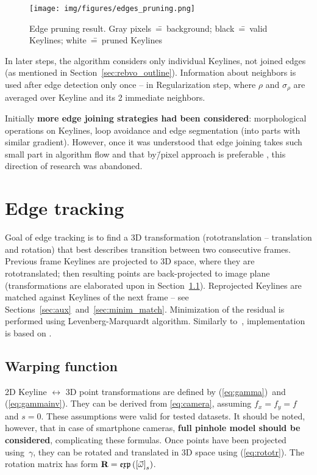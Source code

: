\begin{figure}[ht]
	\centering\texttt{[image: img/figures/edges\_pruning.png]}
	\caption{ Edge pruning result. Gray pixels~\==~background; black~\==~valid Keylines; white~\==~pruned Keylines }
	\label{fig:pruning}
\end{figure}

In later steps, the algorithm considers only individual Keylines, not joined edges (as mentioned in Section~\ref{sec:rebvo_outline}). Information about neighbors is used after edge detection only once -- in Regularization step, where $\rho$ and $\sigma_{\rho}$
are averaged over Keyline and its 2 immediate neighbors.

Initially \textbf{more edge joining strategies had been considered}: morphological operations on Keylines, loop avoidance and edge segmentation (into parts with similar gradient). However, once it was understood that edge joining takes such small part in algorithm flow and that by\=/pixel approach is preferable \cite{harris}, this direction of research was abandoned.



\section{Edge tracking}
\label{sec:edge_tracking}

Goal of edge tracking is to find a 3D transformation (rototranslation -- translation and rotation) that best describes transition between two consecutive frames. Previous frame Keylines are projected to 3D space, where they are rototranslated; then resulting points are back-projected to image plane (transformations are elaborated upon in Section~\ref{sec:warp}). Reprojected Keylines are matched against Keylines of the next frame -- see Sections~\ref{sec:aux}~and~\ref{sec:minim_match}. Minimization of the residual is performed using Levenberg-Marquardt algorithm. Similarly to~\cite{jose2015realtime}, implementation is based on \cite{madsen2004methods}.

\subsection{Warping function}
\label{sec:warp}

2D Keyline $\longleftrightarrow$ 3D point transformations are defined by (\ref{eq:gamma})~and (\ref{eq:gammainv}). They can be derived from \ref{eq:camera}, assuming $f_x = f_y = f$ and $s = 0$. These assumptions were valid for tested datasets. It should be noted, however, that in case of smartphone cameras, \textbf{full pinhole model should be considered}, complicating these formulas. Once points have been projected using~$\gamma$, they can be rotated and translated in 3D space using (\ref{eq:rototr}). The rotation matrix has form $\textbf{R} = \mathfrak{exp} \left ( \left[ \vec{\omega} \right ]_{s} \right )$.


